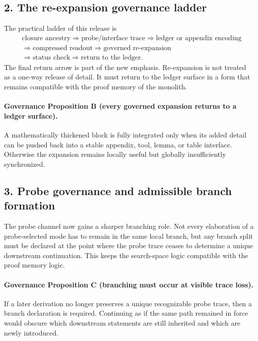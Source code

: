 \documentclass[12pt,a4paper]{article}
\begin{document}
\subsection*{2. The re-expansion governance ladder}
The practical ladder of this release is
\[
\begin{aligned}
&\text{closure ancestry} \Longrightarrow \text{probe/interface trace} \Longrightarrow \text{ledger or appendix encoding}\\
&\Longrightarrow \text{compressed readout} \Longrightarrow \text{governed re-expansion}\\
&\Longrightarrow \text{status check} \Longrightarrow \text{return to the ledger}.
\end{aligned}
\]
The final return arrow is part of the new emphasis. Re-expansion is not treated
as a one-way release of detail. It must return to the ledger surface in a form
that remains compatible with the proof memory of the monolith.

\paragraph{Governance Proposition B (every governed expansion returns to a ledger surface).}
A mathematically thickened block is fully integrated only when its added detail
can be pushed back into a stable appendix, tool, lemma, or table interface.
Otherwise the expansion remains locally useful but globally insufficiently
synchronized.

\subsection*{3. Probe governance and admissible branch formation}
The probe channel now gains a sharper branching role. Not every elaboration of a
probe-selected mode has to remain in the same local branch, but any branch split
must be declared at the point where the probe trace ceases to determine a unique
downstream continuation. This keeps the search-space logic compatible with the
proof memory logic.

\paragraph{Governance Proposition C (branching must occur at visible trace loss).}
If a later derivation no longer preserves a unique recognizable probe trace,
then a branch declaration is required. Continuing as if the same path remained
in force would obscure which downstream statements are still inherited and which
are newly introduced.
\end{document}

